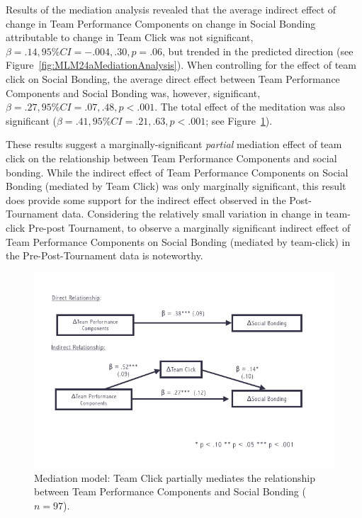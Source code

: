 \begin{CJK}{UTF8}{gbsn}
  Results of the mediation analysis revealed that the average indirect effect of change in Team Performance Components on change in Social Bonding attributable to change in Team Click was not significant, $\beta = .14, 95\% CI = -.004 , .30, p = .06$, but trended in the predicted direction (see Figure~\ref{fig:MLM24aMediationAnalysis}).  When controlling for the effect of team click on Social Bonding, the average direct effect between Team Performance Components and Social Bonding was, however, significant, $\beta = .27, 95\% CI = .07 , .48, p < .001$.  The total effect of the meditation was also significant ($\beta = .41, 95\% CI = .21 , .63, p < .001$; see Figure~\ref{fig:tournamentSurveyMedPrePost}).

  These results suggest a marginally-significant \textit{partial} mediation effect of team click on the relationship between Team Performance Components and social bonding.  While the indirect effect of Team Performance Components on Social Bonding (mediated by Team Click) was only marginally significant, this result does provide some support for the indirect effect observed in the Post-Tournament data.  Considering the relatively small variation in change in team-click Pre-post Tournament, to observe a marginally significant indirect effect of Team Performance Components on Social Bonding (mediated by team-click) in the Pre-Post-Tournament data is noteworthy.



  \begin{figure}
    \centering
    \includegraphics[width=0.9\linewidth,keepaspectratio] {images/tournamentSurveyMedPrePost}
    \caption{Mediation model: Team Click partially mediates the relationship between Team Performance Components and Social Bonding ($n = 97$).}
    \label{fig:tournamentSurveyMedPrePost}
  \end{figure}




\end{CJK}

